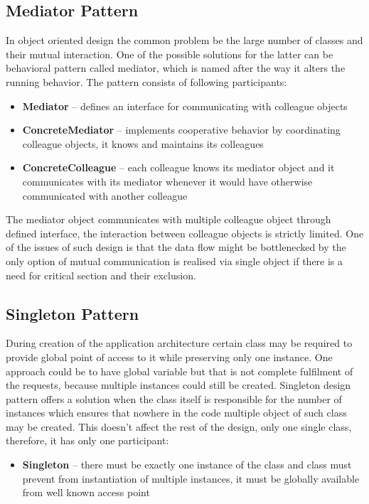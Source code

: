 \subsection{Mediator Pattern}
In object oriented design the common problem be the large number of classes and
their mutual interaction. One of the possible solutions for the latter can be
behavioral pattern called mediator, which is named after the way it alters the
running behavior. The pattern consists of following participants:

\begin{itemize}
\item \textbf{Mediator} -- defines an interface for communicating with colleague 
objects
\item \textbf{ConcreteMediator} -- implements cooperative behavior by 
coordinating colleague objects, it knows and maintains its colleagues
\item \textbf{ConcreteColleague} -- each colleague knows its mediator object and
it communicates with its mediator whenever it would have otherwise communicated 
with another colleague
\end{itemize}

The mediator object communicates with multiple colleague object through defined
interface, the interaction between colleague objects is strictly limited.
One of the issues of such design is that the data flow might be bottlenecked by
the only option of mutual communication is realised via single object if there
is a need for critical section and their exclusion.

\subsection{Singleton Pattern}
During creation of the application architecture certain class may be required
to provide global point of access to it while preserving only one instance.
One approach could be to have global variable but that is not complete 
fulfilment of the requests, because multiple instances could still be created. 
Singleton design pattern offers a solution when the class itself is responsible 
for the number of instances which ensures that nowhere in the code multiple 
object of such class may be created. This doesn't affect the rest of the design, 
only one single class, therefore, it has only one participant:

\begin{itemize}
\item \textbf{Singleton} -- there must be exactly one instance of the class and
class must prevent from instantiation of multiple instances,  it must be 
globally available from well known access point
\end{itemize}


